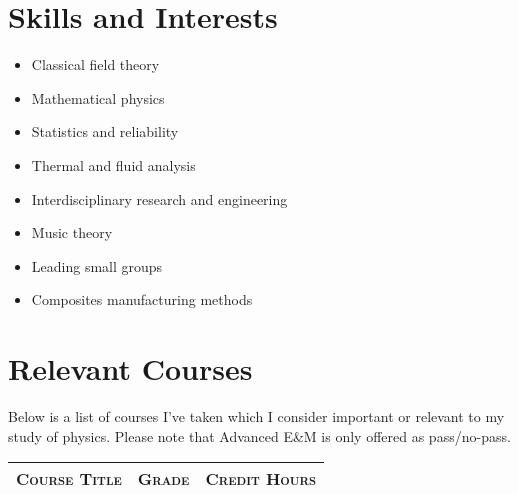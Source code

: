\documentclass[letterpaper]{article}
\begin{document}

\section{Skills and Interests}
\begin{center}
\begin{multicols}{2}
\begin{itemize}
	\item Classical field theory
	\item Mathematical physics
	\item Statistics and reliability
	\item Thermal and fluid analysis
	\item Interdisciplinary research and engineering
	\item Music theory
	\item Leading small groups
	\item Composites manufacturing methods
\end{itemize}
\end{multicols}
\end{center}


\section{Relevant Courses}
\noindent Below is a list of courses I've taken which I consider important or relevant to my study of physics.
Please note that Advanced E\&M is only offered as pass/no-pass.
\begin{center}
\begin{tabular}{llr}
\textsc{Course Title}	&	\textsc{Grade}	&	\textsc{Credit Hours}	\\
	\hline

\end{tabular}
\end{center}

\end{document}
